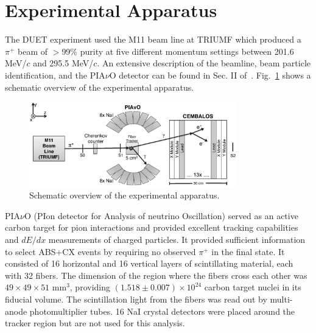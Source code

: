 \section{Experimental Apparatus}\label{sec:experiment}
The DUET experiment used the M11 beam line at TRIUMF which produced a $\pi^{+}$ beam of $>$99\% purity at five different momentum settings between 201.6 MeV/$c$ and 295.5 MeV/$c$. An extensive description of the beamline, beam particle identification, and the PIA$\nu$O detector can be found in Sec. II of~\cite{duet}. Fig.~\ref{fig:config} shows a schematic overview of the experimental apparatus.

\begin{figure}[ht]
\includegraphics[width=90mm]{figures/duet_schematic_for_paper_v2.eps}
\caption{Schematic overview of the experimental apparatus.}
\label{fig:config}
\end{figure}


PIA$\nu$O (PIon detector for Analysis of neutrino Oscillation) served as an active carbon target for pion interactions and  provided excellent tracking capabilities and $dE/dx$ measurements of charged particles. It provided sufficient information to select ABS+CX events by requiring no observed $\pi^{+}$ in the final state. It consisted of 16 horizontal and 16 vertical layers of scintillating material, each with 32 fibers. The dimension of the region where the fibers cross each other was $49\times49\times51$ mm$^3$, providing $(1.518\pm0.007)\times10^{24}$ carbon target nuclei in its fiducial volume. The scintillation light from the fibers was read out by multi-anode photomultiplier tubes. 16 NaI crystal detectors were placed around the tracker region but are not used for this analysis.

